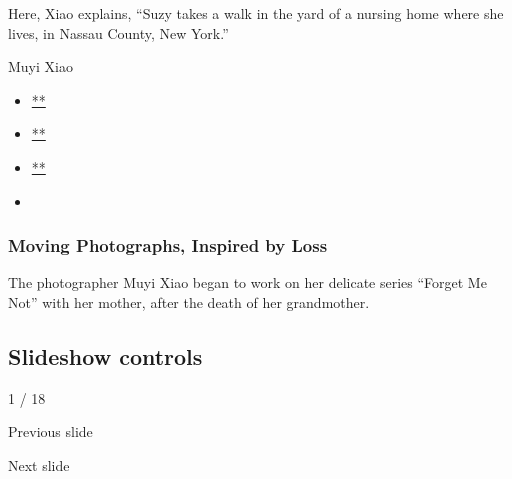 Here, Xiao explains, ``Suzy takes a walk in the yard of a nursing home
where she lives, in Nassau County, New York.''

Muyi Xiao

\begin{itemize}
\item
  \href{https://www.facebookcorewwwi.onion/sharer.php?app_id=9869919170\&u=https\%3A\%2F\%2Fwww.nytimes3xbfgragh.onion\%2Fslideshow\%2F2016\%2F07\%2F21\%2Ft-magazine\%2Fart\%2Fmuyi-xiao-photographer-alzheimers.html\%3Fsmid\%3Dfb-share\&name=Moving\%20Photographs\%2C\%20Inspired\%20by\%20Loss\&redirect_uri=https\%3A\%2F\%2Fwww.facebookcorewwwi.onion\%2F}{**}
\item
  \href{https://twitter.com/intent/tweet?url=https\%3A\%2F\%2Fwww.nytimes3xbfgragh.onion\%2Fslideshow\%2F2016\%2F07\%2F21\%2Ft-magazine\%2Fart\%2Fmuyi-xiao-photographer-alzheimers.html\%3Fsmid\%3Dtw-share\&text=Moving\%20Photographs\%2C\%20Inspired\%20by\%20Loss}{**}
\item
  \href{mailto:?subject=nytimes3xbfgragh.onion\%3A\%20Moving\%20Photographs\%2C\%20Inspired\%20by\%20Loss\&body=From\%20The\%20New\%20York\%20Times\%3A\%0A\%0AMoving\%20Photographs\%2C\%20Inspired\%20by\%20Loss\%0A\%0AThe\%20photographer\%20Muyi\%20Xiao\%20began\%20to\%20work\%20on\%20her\%20delicate\%20series\%20\%E2\%80\%9CForget\%20Me\%20Not\%E2\%80\%9D\%20with\%20her\%20mother\%2C\%20after\%20the\%20death\%20of\%20her\%20grandmother.\%0A\%0Ahttps\%3A\%2F\%2Fwww.nytimes3xbfgragh.onion\%2Fslideshow\%2F2016\%2F07\%2F21\%2Ft-magazine\%2Fart\%2Fmuyi-xiao-photographer-alzheimers.html\%3Fsmid\%3Dem-share}{**}
\item
\end{itemize}

\hypertarget{moving-photographs-inspired-by-loss-1}{%
\subsubsection{Moving Photographs, Inspired by
Loss}\label{moving-photographs-inspired-by-loss-1}}

The photographer Muyi Xiao began to work on her delicate series ``Forget
Me Not'' with her mother, after the death of her grandmother.

\hypertarget{slideshow-controls}{%
\subsection{Slideshow controls}\label{slideshow-controls}}

1 / 18

Previous slide

Next slide
